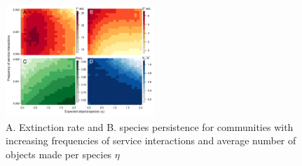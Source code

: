 \documentclass[9pt,twocolumn,twoside]{pnas-new}
\begin{document}
% 
% 
% 
% 


\begin{figure}
\centering
\includegraphics[width=0.5\textwidth]{fig_engineers3.pdf}
\caption{
A. Extinction rate and 
B. species persistence for communities with increasing frequencies of service interactions and average number of objects made per species $\eta$
}
\label{fig:engineers}
\end{figure}


\end{document}
